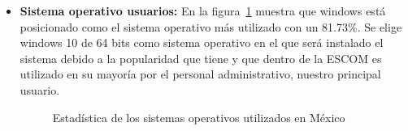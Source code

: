 \begin{itemize}
			
			
			\item \textbf{Sistema operativo usuarios:} En la figura~\ref{fig:so} muestra que windows está posicionado como el sistema operativo más utilizado con un 81.73\%. Se elige windows 10 de 64 bits como sistema operativo en el que será instalado el sistema debido a la popularidad que tiene y que dentro de la ESCOM es utilizado en su mayoría por el personal administrativo, nuestro principal usuario.
			
			\begin{figure}[htbp!]
				\begin{center}
					\caption{Estadística de los sistemas operativos utilizados en México}
					\label{fig:so}
				\end{center}
			\end{figure}
		
			
		\end{itemize}
	
